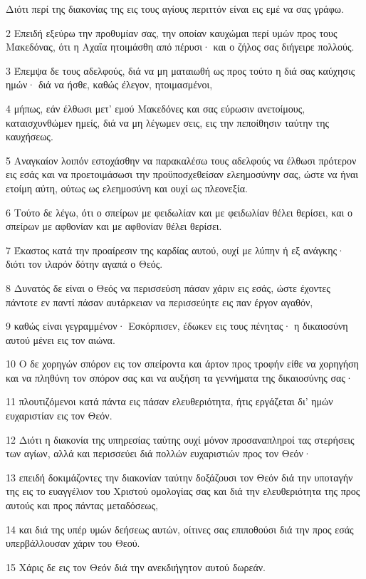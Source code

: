 \par Διότι περί της διακονίας της εις τους αγίους περιττόν είναι εις εμέ να σας γράφω.
\par 2 Επειδή εξεύρω την προθυμίαν σας, την οποίαν καυχώμαι περί υμών προς τους Μακεδόνας, ότι η Αχαΐα ητοιμάσθη από πέρυσι· και ο ζήλος σας διήγειρε πολλούς.
\par 3 Έπεμψα δε τους αδελφούς, διά να μη ματαιωθή ως προς τούτο η διά σας καύχησις ημών· διά να ήσθε, καθώς έλεγον, ητοιμασμένοι,
\par 4 μήπως, εάν έλθωσι μετ' εμού Μακεδόνες και σας εύρωσιν ανετοίμους, καταισχυνθώμεν ημείς, διά να μη λέγωμεν σεις, εις την πεποίθησιν ταύτην της καυχήσεως.
\par 5 Αναγκαίον λοιπόν εστοχάσθην να παρακαλέσω τους αδελφούς να έλθωσι πρότερον εις εσάς και να προετοιμάσωσι την προϋποσχεθείσαν ελεημοσύνην σας, ώστε να ήναι ετοίμη αύτη, ούτως ως ελεημοσύνη και ουχί ως πλεονεξία.
\par 6 Τούτο δε λέγω, ότι ο σπείρων με φειδωλίαν και με φειδωλίαν θέλει θερίσει, και ο σπείρων με αφθονίαν και με αφθονίαν θέλει θερίσει.
\par 7 Έκαστος κατά την προαίρεσιν της καρδίας αυτού, ουχί με λύπην ή εξ ανάγκης· διότι τον ιλαρόν δότην αγαπά ο Θεός.
\par 8 Δυνατός δε είναι ο Θεός να περισσεύση πάσαν χάριν εις εσάς, ώστε έχοντες πάντοτε εν παντί πάσαν αυτάρκειαν να περισσεύητε εις παν έργον αγαθόν,
\par 9 καθώς είναι γεγραμμένον· Εσκόρπισεν, έδωκεν εις τους πένητας· η δικαιοσύνη αυτού μένει εις τον αιώνα.
\par 10 Ο δε χορηγών σπόρον εις τον σπείροντα και άρτον προς τροφήν είθε να χορηγήση και να πληθύνη τον σπόρον σας και να αυξήση τα γεννήματα της δικαιοσύνης σας·
\par 11 πλουτιζόμενοι κατά πάντα εις πάσαν ελευθεριότητα, ήτις εργάζεται δι' ημών ευχαριστίαν εις τον Θεόν.
\par 12 Διότι η διακονία της υπηρεσίας ταύτης ουχί μόνον προσαναπληροί τας στερήσεις των αγίων, αλλά και περισσεύει διά πολλών ευχαριστιών προς τον Θεόν·
\par 13 επειδή δοκιμάζοντες την διακονίαν ταύτην δοξάζουσι τον Θεόν διά την υποταγήν της εις το ευαγγέλιον του Χριστού ομολογίας σας και διά την ελευθεριότητα της προς αυτούς και προς πάντας μεταδόσεως,
\par 14 και διά της υπέρ υμών δεήσεως αυτών, οίτινες σας επιποθούσι διά την προς εσάς υπερβάλλουσαν χάριν του Θεού.
\par 15 Χάρις δε εις τον Θεόν διά την ανεκδιήγητον αυτού δωρεάν.

